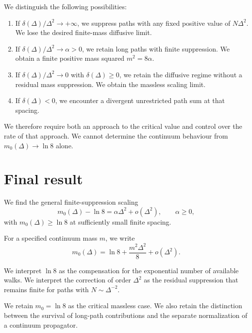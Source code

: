 \documentclass[11pt,a4paper]{article}
\numberwithin{equation}{section}
\begin{document}
We distinguish the following possibilities:
\begin{enumerate}
    \item If
    $\delta(\Delta)/\Delta^2\to+\infty$,
    we suppress paths with any fixed positive
    value of $N\Delta^2$. We lose the desired
    finite-mass diffusive limit.

    \item If
    $\delta(\Delta)/\Delta^2\to\alpha>0$,
    we retain long paths with finite suppression.
    We obtain a finite positive mass squared
    $m^2=8\alpha$.

    \item If
    $\delta(\Delta)/\Delta^2\to0$ with
    $\delta(\Delta)\geq0$,
    we retain the diffusive regime without a
    residual mass suppression. We obtain the
    massless scaling limit.

    \item If $\delta(\Delta)<0$, we encounter
    a divergent unrestricted path sum at that
    spacing.
\end{enumerate}

We therefore require both an approach to the
critical value and control over the rate of that
approach. We cannot determine the continuum
behaviour from $m_0(\Delta)\to\ln8$ alone.

\section{Final result}

We find the general finite-suppression scaling
\begin{equation}
    \boxed{
    m_0(\Delta)-\ln8
    =
    \alpha\Delta^2+o(\Delta^2),
    \qquad \alpha\geq0,
    }
\end{equation}
with $m_0(\Delta)\geq\ln8$ at sufficiently small
finite spacing.

For a specified continuum mass $m$, we write
\begin{equation}
    \boxed{
    m_0(\Delta)
    =
    \ln8+\frac{m^2\Delta^2}{8}+o(\Delta^2).
    }
\end{equation}

We interpret $\ln8$ as the compensation for the
exponential number of available walks. We
interpret the correction of order $\Delta^2$
as the residual suppression that remains finite
for paths with $N\sim\Delta^{-2}$.

We retain $m_0=\ln8$ as the critical massless
case. We also retain the distinction between
the survival of long-path contributions and
the separate normalization of a continuum
propagator.
\end{document}
